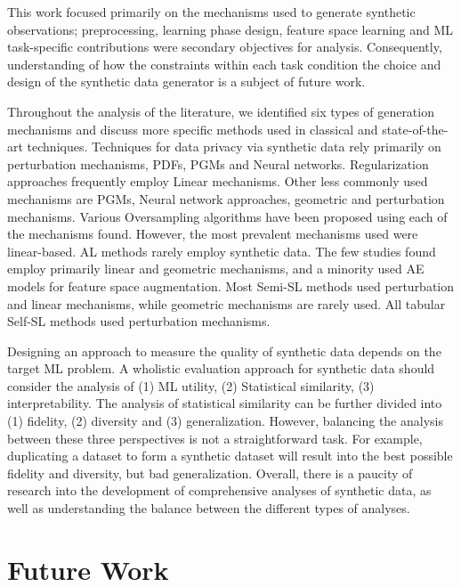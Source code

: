 \documentclass[parskip=full]{scrartcl}
\begin{document}
This work focused primarily on the mechanisms used to generate synthetic
observations; preprocessing, learning phase design, feature space learning and
ML task-specific contributions were secondary objectives for analysis.
Consequently, understanding of how the constraints within each task condition
the choice and design of the synthetic data generator is a subject of future
work.

Throughout the analysis of the literature, we identified six types of
generation mechanisms and discuss more specific methods used in classical and
state-of-the-art techniques. Techniques for data privacy via synthetic data
rely primarily on perturbation mechanisms, PDFs, PGMs and Neural networks.
Regularization approaches frequently employ Linear mechanisms. Other less
commonly used mechanisms are PGMs, Neural network approaches, geometric and
perturbation mechanisms. Various Oversampling algorithms have been proposed
using each of the mechanisms found. However, the most prevalent mechanisms
used were linear-based. AL methods rarely employ synthetic data. The few
studies found employ primarily linear and geometric mechanisms, and a minority
used AE models for feature space augmentation. Most Semi-SL methods used
perturbation and linear mechanisms, while geometric mechanisms are rarely
used. All tabular Self-SL methods used perturbation mechanisms. 

Designing an approach to measure the quality of synthetic data depends on the
target ML problem. A wholistic evaluation approach for synthetic data should
consider the analysis of (1) ML utility, (2) Statistical similarity, (3)
interpretability. The analysis of statistical similarity can be further
divided into (1) fidelity, (2) diversity and (3) generalization.  However,
balancing the analysis between these three perspectives is not a
straightforward task. For example, duplicating a dataset to form a synthetic
dataset will result into the best possible fidelity and diversity, but bad
generalization. Overall, there is a paucity of research into the development
of comprehensive analyses of synthetic data, as well as understanding the
balance between the different types of analyses.

\section{Future Work}\label{sec:future-work}
\end{document}
